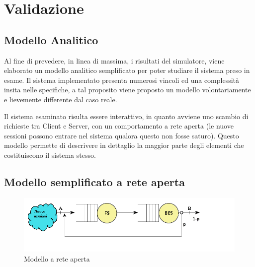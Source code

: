 \chapter{Validazione} 

\section{Modello Analitico}
Al fine di prevedere, in linea di massima, i risultati del simulatore, viene 
elaborato un modello  analitico semplificato per poter studiare il sistema preso 
in esame.
Il sistema implementato presenta numerosi vincoli ed una complessit\`a insita 
nelle specifiche, a tal proposito viene proposto un modello volontariamente e 
lievemente differente dal caso reale.

Il sistema esaminato risulta essere interattivo, in quanto avviene uno scambio 
di richieste tra Client e Server, con un comportamento a rete aperta (le nuove 
sessioni possono entrare nel sistema qualora questo non fosse saturo).
Questo modello permette di descrivere in dettaglio 
la maggior parte degli elementi che costituiscono il sistema stesso.

\section{Modello semplificato a rete aperta}
\begin{figure}[H]
  \centering
  \includegraphics[scale=0.7]{img/reteJackson.png}
  \caption[Modello a rete aperta]{Modello a rete aperta}
  \label{fig:Modello a rete aperta}
\end{figure}


